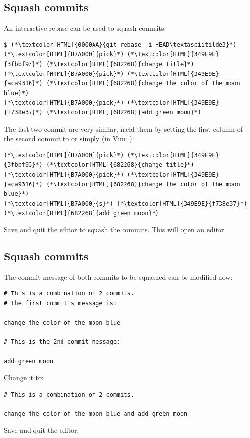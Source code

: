 \subsection{Squash commits}
\begin{frame}[fragile]
  \subslidetitle
  An interactive rebase can be used to squash commits:
  \begin{lstlisting}
$ (*\textcolor[HTML]{0000AA}{git rebase -i HEAD\textasciitilde3}*)
(*\textcolor[HTML]{B7A000}{pick}*) (*\textcolor[HTML]{349E9E}{3fbbf93}*) (*\textcolor[HTML]{682268}{change title}*)
(*\textcolor[HTML]{B7A000}{pick}*) (*\textcolor[HTML]{349E9E}{aca9316}*) (*\textcolor[HTML]{682268}{change the color of the moon blue}*)
(*\textcolor[HTML]{B7A000}{pick}*) (*\textcolor[HTML]{349E9E}{f738e37}*) (*\textcolor[HTML]{682268}{add green moon}*)
\end{lstlisting}

  The last two commit are very similar, meld them by setting the first
  column of the second commit to  or simply  (in Vim: ):
  \begin{lstlisting}
(*\textcolor[HTML]{B7A000}{pick}*) (*\textcolor[HTML]{349E9E}{3fbbf93}*) (*\textcolor[HTML]{682268}{change title}*)
(*\textcolor[HTML]{B7A000}{pick}*) (*\textcolor[HTML]{349E9E}{aca9316}*) (*\textcolor[HTML]{682268}{change the color of the moon blue}*)
(*\textcolor[HTML]{B7A000}{s}*) (*\textcolor[HTML]{349E9E}{f738e37}*) (*\textcolor[HTML]{682268}{add green moon}*)
\end{lstlisting}
  Save and quit the editor to squash the commits. This will open an editor.
\end{frame}

\subsection{Squash commits}
\begin{frame}[fragile]
  \subslidetitle
  The commit message of both commits to be squashed can be modified now:
  \begin{lstlisting}
# This is a combination of 2 commits.
# The first commit's message is:

change the color of the moon blue

# This is the 2nd commit message:

add green moon
\end{lstlisting}

  Change it to:
  \begin{lstlisting}
# This is a combination of 2 commits.

change the color of the moon blue and add green moon

\end{lstlisting}
  Save and quit the editor.
\end{frame}

